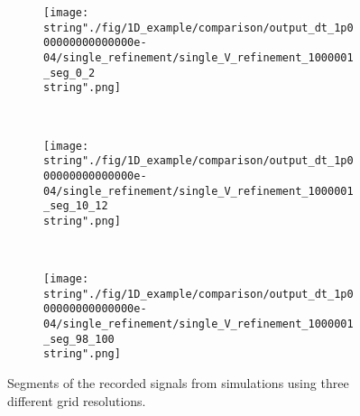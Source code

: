 
\hspace{-0.05\textwidth}
\begin{minipage}[t]{.5\textwidth}
%
\begin{figure}[H]
\captionsetup{width=0.95\textwidth,font=footnotesize,labelfont=footnotesize}
\centering
%
\begin{subfigure}[b]{1\textwidth}
%
\centering\texttt{[image: \\string"./fig/1D\_example/comparison/output\_dt\_1p000000000000000e-04/single\_refinement/single\_V\_refinement\_1000001\_seg\_0\_2\\string".png]}
%
\end{subfigure}\hfill
\\[2ex]
%
\begin{subfigure}[b]{1\textwidth}
%
\centering\texttt{[image: \\string"./fig/1D\_example/comparison/output\_dt\_1p000000000000000e-04/single\_refinement/single\_V\_refinement\_1000001\_seg\_10\_12\\string".png]}
%
\end{subfigure}\hfill
\\[2ex]
%
\begin{subfigure}[b]{1\textwidth}
%
\centering\texttt{[image: \\string"./fig/1D\_example/comparison/output\_dt\_1p000000000000000e-04/single\_refinement/single\_V\_refinement\_1000001\_seg\_98\_100\\string".png]}
%
\end{subfigure}\hfill
%
\caption{Segments of the recorded signals from simulations using three different grid resolutions.}
\label{single_Refinement_V_segments}
\end{figure}
%
\end{minipage}
%
\hfill %
%

